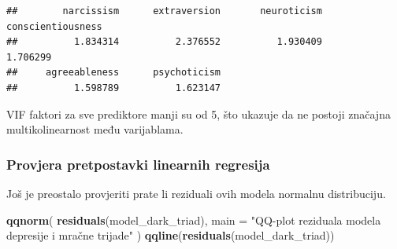 \documentclass[
]{article}
\newenvironment{Shaded}{\begin{snugshade}}{\end{snugshade}}
\newcommand{\AttributeTok}[1]{\textcolor[rgb]{0.13,0.29,0.53}{#1}}
\newcommand{\ControlFlowTok}[1]{\textcolor[rgb]{0.13,0.29,0.53}{\textbf{#1}}}
\newcommand{\DecValTok}[1]{\textcolor[rgb]{0.00,0.00,0.81}{#1}}
\newcommand{\FunctionTok}[1]{\textcolor[rgb]{0.13,0.29,0.53}{\textbf{#1}}}
\newcommand{\NormalTok}[1]{#1}
\newcommand{\OtherTok}[1]{\textcolor[rgb]{0.56,0.35,0.01}{#1}}
\newcommand{\SpecialCharTok}[1]{\textcolor[rgb]{0.81,0.36,0.00}{\textbf{#1}}}
\newcommand{\StringTok}[1]{\textcolor[rgb]{0.31,0.60,0.02}{#1}}
\begin{document}
\begin{Shaded}
\end{Shaded}

\begin{verbatim}
##        narcissism      extraversion       neuroticism conscientiousness 
##          1.834314          2.376552          1.930409          1.706299 
##     agreeableness      psychoticism 
##          1.598789          1.623147
\end{verbatim}

VIF faktori za sve prediktore manji su od 5, što ukazuje da ne postoji
značajna multikolinearnost među varijablama.

\subsubsection{Provjera pretpostavki linearnih
regresija}\label{provjera-pretpostavki-linearnih-regresija}

Još je preostalo provjeriti prate li reziduali ovih modela normalnu
distribuciju.

\begin{Shaded}
\begin{Highlighting}[]
\FunctionTok{qqnorm}\NormalTok{(}
  \FunctionTok{residuals}\NormalTok{(model\_dark\_triad),}
  \AttributeTok{main =} \StringTok{"QQ{-}plot reziduala modela depresije i mračne trijade"}
\NormalTok{)}
\FunctionTok{qqline}\NormalTok{(}\FunctionTok{residuals}\NormalTok{(model\_dark\_triad))}
\end{Highlighting}
\end{Shaded}
\end{document}
